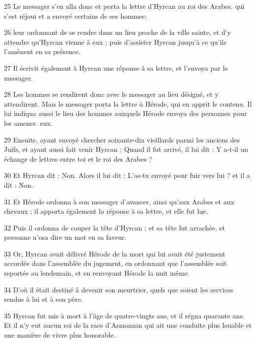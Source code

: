\par 25 Le messager s'en alla donc et porta la lettre d'Hyrcan au roi des Arabes. qui s'est réjoui et a envoyé certains de ses hommes;

\par 26 leur ordonnant de se rendre dans un lieu proche de la ville sainte, et d'y attendre qu'Hyrcan vienne à eux ; puis d'assister Hyrcan jusqu'à ce qu'ils l'amènent en sa présence.

\par 27 Il écrivit également à Hyrcan une réponse à sa lettre, et l'envoya par le messager.

\par 28 Les hommes se rendirent donc avec le messager au lieu désigné, et y attendirent. Mais le messager porta la lettre à Hérode, qui en apprit le contenu. Il lui indiqua aussi le lieu des hommes auxquels Hérode envoya des personnes pour les amener. eux.

\par 29 Ensuite, ayant envoyé chercher soixante-dix vieillards parmi les anciens des Juifs, et ayant aussi fait venir Hyrcan ; Quand il fut arrivé, il lui dit : Y a-t-il un échange de lettres entre toi et le roi des Arabes ?

\par 30 Et Hyrcan dit : Non. Alors il lui dit : L'as-tu envoyé pour fuir vers lui ? et il a dit : Non.

\par 31 Et Hérode ordonna à son messager d'avancer, ainsi qu'aux Arabes et aux chevaux ; il apporta également la réponse à sa lettre, et elle fut lue.

\par 32 Puis il ordonna de couper la tête d'Hyrcan ; et sa tête fut arrachée, et personne n'osa dire un mot en sa faveur.

\par 33 Or, Hyrcan avait délivré Hérode de la mort qui lui avait été justement accordée dans l'assemblée du jugement, en ordonnant que l'assemblée soit reportée au lendemain, et en renvoyant Hérode la nuit même.

\par 34 D'où il était destiné à devenir son meurtrier, quels que soient les services rendus à lui et à son père.

\par 35 Hyrcan fut mis à mort à l'âge de quatre-vingts ans, et il régna quarante ans. Et il n'y eut aucun roi de la race d'Asmonzan qui ait une conduite plus louable et une manière de vivre plus honorable.


